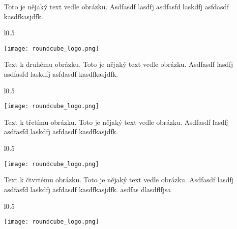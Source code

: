\documentclass[12pt,a4paper,twoside]{book}
\begin{document}
Toto je nějaký text vedle obrázku. Asdfasdf lasdfj asdfasfd laskdfj asfdasdf kasdfkasjdfk.
\newline

\begin{wrapfigure}{l}{0.5\textwidth}
  \vspace{-20pt}
  \begin{center}
    \texttt{[image: roundcube\_logo.png]}
  \end{center}
  \vspace{-20pt}
\end{wrapfigure}

Text k druhému obrázku. Toto je nějaký text vedle obrázku. Asdfasdf lasdfj asdfasfd laskdfj asfdasdf kasdfkasjdfk.
\newline

\begin{wrapfigure}{l}{0.5\textwidth}
  \vspace{-20pt}
  \begin{center}
    \texttt{[image: roundcube\_logo.png]}
  \end{center}
  \vspace{-20pt}
\end{wrapfigure}

Text k třetímu obrázku. Toto je nějaký text vedle obrázku. Asdfasdf lasdfj asdfasfd laskdfj asfdasdf kasdfkasjdfk.
\newline

\begin{wrapfigure}{l}{0.5\textwidth}
  \vspace{-20pt}
  \begin{center}
    \texttt{[image: roundcube\_logo.png]}
  \end{center}
  \vspace{-20pt}
\end{wrapfigure}

Text k čtvrtému obrázku. Toto je nějaký text vedle obrázku. Asdfasdf lasdfj asdfasfd laskdfj asfdasdf kasdfkasjdfk.
\newline
asdfas dlasdflfjsa 

\begin{wrapfigure}{l}{0.5\textwidth}
  \vspace{-30pt}
  \begin{center}
    \texttt{[image: roundcube\_logo.png]}
  \end{center}
  \vspace{-10pt}
\end{wrapfigure}
\end{document}
